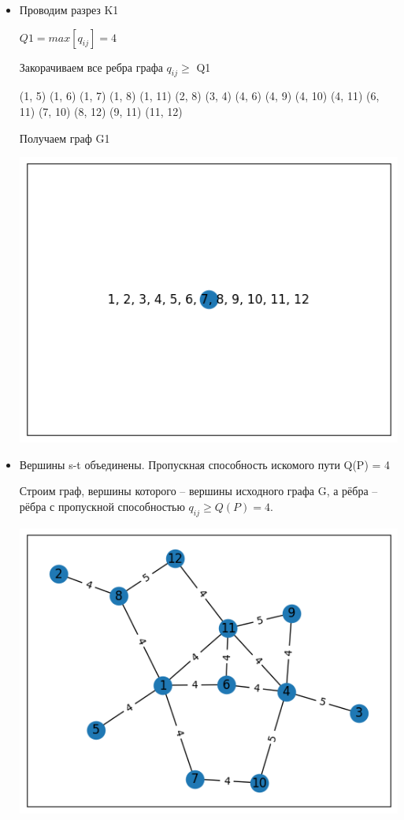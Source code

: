 \documentclass{article}
\begin{document}
\begin{itemize}
  \item Проводим разрез K1

        $Q1 = max[q_{ij}] = 4$

        Закорачиваем все ребра графа $q_{ij} \ge$ Q1

        (1, 5) (1, 6) (1, 7) (1, 8) (1, 11) (2, 8) (3, 4) (4, 6) (4, 9) (4, 10) (4, 11) (6, 11) (7, 10) (8, 12) (9, 11) (11, 12)

        Получаем граф G1
        \begin{center}
          \includegraphics*{2.png}
        \end{center}
  \item Вершины s-t объединены. Пропускная способность искомого пути Q(P) = 4

        Строим граф, вершины которого – вершины исходного графа G, а рёбра – рёбра с пропускной способностью $q_{ij} \ge Q(P) = 4$.

        \begin{center}
          \includegraphics*{3.png}
        \end{center}
\end{itemize}
\end{document}
